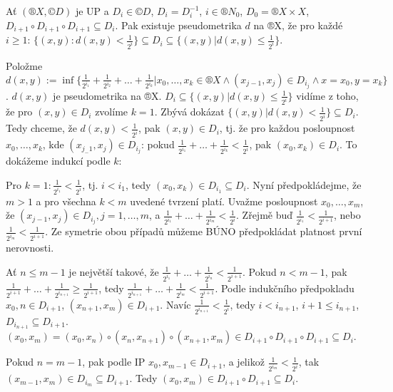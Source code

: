 \documentclass[12pt]{article}                   %
\begin{document}
    \begin{lemma}[O pseudometrice]
        Ať $(®X, ©D)$ je UP a $D_i \in ©D$, $D_i = D_i^{-1}$, $i \in ®N_0$, $D_0 = ®X \times X$, $D_{i+1} \circ D_{i+1} \circ D_{i+1} \subseteq D_i$. Pak existuje pseudometrika $d$ na ®X, že pro každé $i ≥ 1$: $\{(x, y) : d(x, y) < \frac{1}{2^i}\} \subseteq D_i \subseteq \{(x, y) | d(x, y) ≤ \frac{1}{2^i}\}$.


        \begin{dukazin}
            Položme $d(x, y) := \inf\{\frac{1}{2^{i_1}} + \frac{1}{2^{i_2}} + … + \frac{1}{2^{i_k}} | x_0, …, x_k \in ®X \land (x_{j-1}, x_j) \in D_{i_j} \land x = x_0, y=x_k\}$. $d(x, y)$ je pseudometrika na ®X. $D_i \subseteq \{(x, y) | d(x, y) ≤ \frac{1}{2^i}\}$ vidíme z toho, že pro $(x, y) \in D_i$ zvolíme $k=1$. Zbývá dokázat $\{(x, y) | d(x, y) < \frac{1}{2^i}\} \subseteq D_i$. Tedy chceme, že $d(x, y) < \frac{1}{2^i}$, pak $(x, y) \in D_i$, tj. že pro každou posloupnost $x_0, …, x_k$, kde $(x_{j_-1}, x_j) \in D_{i_j}$: pokud $\frac{1}{2^{i_1}} + … + \frac{1}{2^{i_k}} < \frac{1}{2^i}$, pak $(x_0, x_k) \in D_i$. To dokážeme indukcí podle $k$:

            Pro $k=1: \frac{1}{2^{i_1}} < \frac{1}{2^i}$, tj. $i < i_1$, tedy $(x_0, x_k) \in D_{i_1} \subseteq D_i$. Nyní předpokládejme, že $m > 1$ a pro všechna $k < m$ uvedené tvrzení platí. Uvažme posloupnost $x_0, …, x_m$, že $(x_{j-1}, x_j) \in D_{i_j}, j = 1, …, m$, a $\frac{1}{2^{i_1}} + … + \frac{1}{2^{i_m}} < \frac{1}{2^i}$. Zřejmě buď $\frac{1}{2^{i_1}} < \frac{1}{2^{i+1}}$, nebo $\frac{1}{2^{i_m}} < \frac{1}{2^{i+1}}$. Ze symetrie obou případů můžeme BÚNO předpokládat platnost první nerovnosti.

            Ať $n ≤ m-1$ je největší takové, že $\frac{1}{2^{i_1}} + … + \frac{1}{2^{i_n}} < \frac{1}{2^{i+1}}$. Pokud $n < m-1$, pak $\frac{1}{2^{i+1}} + … + \frac{1}{2^{i_{n+1}}} ≥ \frac{1}{2^{i+1}}$, tedy $\frac{1}{2^{i_{n+1}}} + … + \frac{1}{2^{i_m}} < \frac{1}{2^{i+1}}$. Podle indukčního předpokladu $x_0, n \in D_{i+1}$, $(x_{n+1}, x_m) \in D_{i+1}$. Navíc $\frac{1}{2^{i_{n+1}}} < \frac{1}{2^i}$, tedy $i < i_{n+1}$, $i + 1 ≤ i_{n+1}$, $D_{i_{n+1}} \subseteq D_{i+1}$. $(x_0, x_m) = (x_0, x_n)\circ(x_n, x_{n+1})\circ(x_{n+1}, x_m) \in D_{i+1}\circ D_{i+1}\circ D_{i+1} \subseteq D_i$.

            Pokud $n = m-1$, pak podle IP $x_0, x_{m-1} \in D_{i+1}$, a jelikož $\frac{1}{2^{i_m}} < \frac{1}{2^i}$, tak $(x_{m-1}, x_m)\in D_{i_m} \subseteq D_{i+1}$. Tedy $(x_0, x_m) \in D_{i+1}\circ D_{i+1} \subseteq D_i$.
        \end{dukazin}
    \end{lemma}
\end{document}
